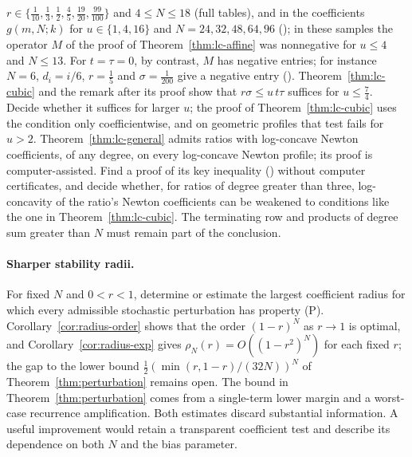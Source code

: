 \documentclass[twoside,10pt]{article}
\numberwithin{equation}{section}
\theoremstyle{slbody}
\theoremstyle{definition}
\theoremstyle{remark}
\renewcommand{\eqref}[1]{\textup{{\normalfont(\oldstylenums{\ref{#1}}}\normalfont)}}
\begin{document}
$r\in\{\frac1{10},\frac13,\frac12,\frac45,\frac{19}{20},\frac{99}{100}\}$ and $4\leq N\leq18$ (full tables), and in the coefficients $g(m,N;k)$ for $u\in\{1,4,16\}$ and $N=24,32,48,64,96$ (); in these samples the operator $M$ of the proof of Theorem~\ref{thm:lc-affine} was nonnegative for $u\leq4$ and $N\leq13$. For $t=\tau=0$, by contrast, $M$ has negative entries; for instance $N=6$, $d_i=i/6$, $r=\frac15$ and $\sigma=\frac1{200}$ give a negative entry (). Theorem~\ref{thm:lc-cubic} and the remark after its proof show that $r\sigma\leq u\,t\tau$ suffices for $u\leq\frac74$. Decide whether it suffices for larger $u$; the proof of Theorem~\ref{thm:lc-cubic} uses the condition only coefficientwise, and on geometric profiles that test fails for $u>2$. Theorem~\ref{thm:lc-general} admits ratios with log-concave Newton coefficients, of any degree, on every log-concave Newton profile; its proof is computer-assisted. Find a proof of its key inequality \eqref{eq:G-key} without computer certificates, and decide whether, for ratios of degree greater than three, log-concavity of the ratio's Newton coefficients can be weakened to conditions like the one in Theorem~\ref{thm:lc-cubic}. The terminating row and products of degree sum greater than $N$ must remain part of the conclusion.

\paragraph{Sharper stability radii.}
For fixed $N$ and $0<r<1$, determine or estimate the largest coefficient radius for which every admissible stochastic perturbation has property (P). Corollary~\ref{cor:radius-order} shows that the order $(1-r)^N$ as $r\to1$ is optimal, and Corollary~\ref{cor:radius-exp} gives $\rho_N(r)=O((1-r^2)^N)$ for each fixed $r$; the gap to the lower bound $\tfrac12(\min(r,1-r)/(32N))^N$ of Theorem~\ref{thm:perturbation} remains open. The bound in Theorem~\ref{thm:perturbation} comes from a single-term lower margin and a worst-case recurrence amplification. Both estimates discard substantial information. A useful improvement would retain a transparent coefficient test and describe its dependence on both $N$ and the bias parameter.
\end{document}
